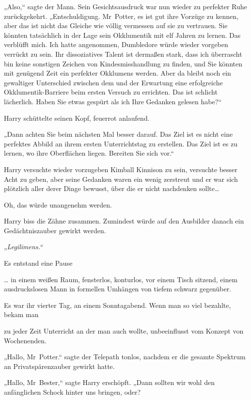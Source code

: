 {„Also,“ sagte der Mann. Sein Gesichtsausdruck war nun wieder zu perfekter Ruhe zurückgekehrt. „Entschuldigung. Mr~Potter, es ist gut ihre Vorzüge zu kennen, aber das ist nicht das Gleiche wie völlig vermessen auf sie zu vertrauen. Sie könnten tatsächlich in der Lage sein Okklumentik mit elf Jahren zu lernen. Das verblüfft mich. Ich hatte angenommen, Dumbledore würde wieder vorgeben verrückt zu sein. Ihr dissoziatives Talent ist dermaßen stark, dass ich überrascht bin keine sonstigen Zeichen von Kindesmisshandlung zu finden, und Sie könnten mit genügend Zeit ein perfekter Okklumens werden. Aber da bleibt noch ein gewaltiger Unterschied zwischen dem und der Erwartung eine erfolgreiche Okklumentik-Barriere beim ersten Versuch zu errichten. Das ist schlicht lächerlich. Haben Sie etwas gespürt als ich Ihre Gedanken gelesen habe?“

Harry schüttelte seinen Kopf, feuerrot anlaufend.

„Dann achten Sie beim nächsten Mal besser darauf. Das Ziel ist es nicht eine perfektes Abbild an ihrem ersten Unterrichtstag zu erstellen. Das Ziel ist es zu lernen, wo ihre Oberflächen liegen. Bereiten Sie sich vor.“

Harry versuchte wieder vorzugeben Kimball Kinnison zu sein, versuchte besser Acht zu geben, aber seine Gedanken waren ein wenig zerstreut und er war sich plötzlich aller derer Dinge bewusst, über die er nicht nachdenken sollte…

Oh, das würde unangenehm werden.

Harry biss die Zähne zusammen. Zumindest würde auf den Ausbilder danach ein Gedächtniszauber gewirkt werden.

„\emph{Legilimens.“}

Es entstand eine Pause \later

… in einem weißen Raum, fensterlos, konturlos, vor einem Tisch sitzend, einem ausdruckslosen Mann in formellen Umhängen von tiefem schwarz gegenüber.

Es war ihr vierter Tag, an einem Sonntagabend. Wenn man so viel bezahlte, bekam man

zu jeder Zeit Unterricht an der man auch wollte, unbeeinflusst vom Konzept von Wochenenden.

„Hallo, Mr~Potter.“ sagte der Telepath tonlos, nachdem er die gesamte Spektrum an Privatspärenzauber gewirkt hatte.

„Hallo, Mr~Bester,“ sagte Harry erschöpft. „Dann sollten wir wohl den anfänglichen Schock hinter uns bringen, oder?

}

